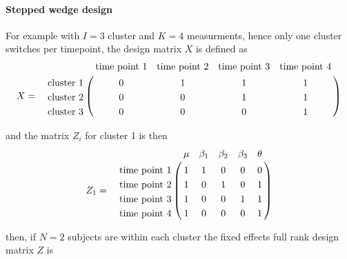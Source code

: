 \documentclass{article}
\begin{document}
\paragraph{Stepped wedge design}


For example with $I=3$ cluster and $K=4$ measurments, hence only one cluster switches per timepoint, 
the design matrix $X$ is defined as
\begin{eqnarray*}
	X &=&  \bordermatrix{
  					& \textrm{time point 1}	& \textrm{time point 2} & \textrm{time point 3} & \textrm{time point 4} \cr
\textrm{cluster 1} 	& 0&1	&1&1\cr
\textrm{cluster 2}	& 0&0	&1&1\cr
\textrm{cluster 3}  & 0&0	&0&1\cr
}
\end{eqnarray*}


and the matrix $Z_{i}$ for cluster 1 is then 
\begin{eqnarray*}
Z_{1} &=&  \bordermatrix{
  						& \mu	&\beta_{1}	& \beta_{2}	& \beta_{3}  &\theta\cr
\textrm{time point 1} 	& 1		&1			&0		 	& 0& 0\cr
\textrm{time point 2} 	&1 		&0 			&1			& 0& 1\cr
\textrm{time point 3}	&1 		&0			&0			& 1& 1\cr
\textrm{time point 4}  &1 		&0			&0		&0	& 1\cr
}
\end{eqnarray*}

then, if $N=2$ subjects are within each cluster the fixed effects full rank design matrix $Z$ is 
\end{document}
